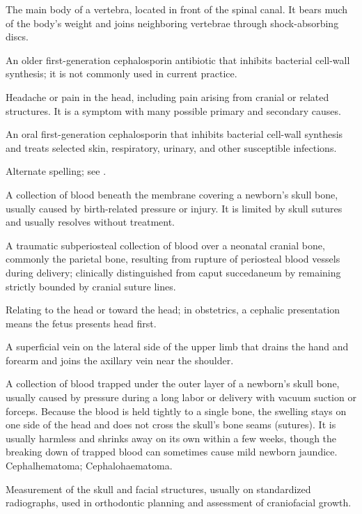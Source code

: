  The main body of a vertebra, located in front of the spinal canal. It bears much of the body's weight and joins neighboring vertebrae through shock-absorbing discs.

 An older first-generation cephalosporin antibiotic that inhibits bacterial cell-wall synthesis; it is not commonly used in current practice.

 Headache or pain in the head, including pain arising from cranial or related structures.
It is a symptom with many possible primary and secondary causes.

 An oral first-generation cephalosporin that inhibits bacterial cell-wall synthesis and treats selected skin, respiratory, urinary, and other susceptible infections.

 Alternate spelling; see .

 A collection of blood beneath the membrane covering a newborn's skull bone, usually caused by birth-related pressure or injury. It is limited by skull sutures and usually resolves without treatment.

 A traumatic subperiosteal collection of blood over a neonatal cranial bone, commonly the parietal bone, resulting from rupture of periosteal blood vessels during delivery; clinically distinguished from caput succedaneum by remaining strictly bounded by cranial suture lines.

 Relating to the head or toward the head; in obstetrics, a cephalic presentation means the fetus presents head first.

 A superficial vein on the lateral side of the upper limb that drains the hand and forearm and joins the axillary vein near the shoulder.

 A collection of blood trapped under the outer layer of a newborn's skull bone, usually caused by pressure during a long labor or delivery with vacuum suction or forceps. Because the blood is held tightly to a single bone, the swelling stays on one side of the head and does not cross the skull's bone seams (sutures). It is usually harmless and shrinks away on its own within a few weeks, though the breaking down of trapped blood can sometimes cause mild newborn jaundice.
\synonyms Cephalhematoma; Cephalohaematoma.

 Measurement of the skull and facial structures, usually on standardized radiographs, used in orthodontic planning and assessment of craniofacial growth.

